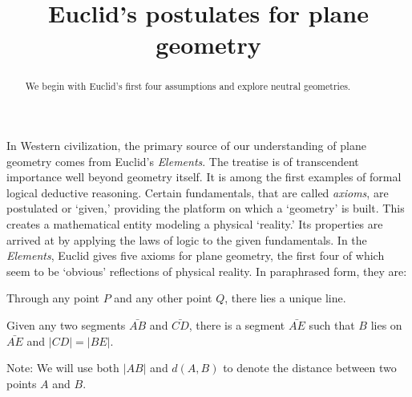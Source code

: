 \documentclass[noauthor,nooutcomes,12pt,hints,newpage,handout]{ximera}
\title{Euclid's postulates for plane geometry} %
\begin{document}
\begin{abstract}
We begin with Euclid's first four assumptions and explore neutral
geometries.
\end{abstract}
\maketitle







In Western civilization, the primary source of our understanding of
plane geometry comes from Euclid's \textit{Elements}. The treatise is
of transcendent importance well beyond geometry itself. It is among
the first examples of formal logical deductive reasoning. Certain
fundamentals, that are called \textit{axioms}, are postulated or
`given,' providing the platform on which a `geometry' is built. This
creates a mathematical entity modeling a physical `reality.' Its
properties are arrived at by applying the laws of logic to the given
fundamentals. In the \textit{Elements}, Euclid gives five axioms for
plane geometry, the first four of which seem to be `obvious'
reflections of physical reality. In paraphrased form, they are:

\begin{axiom}
Through any point $P$ and any other point $Q$, there lies a unique
line.
\end{axiom}

\begin{axiom}
Given any two segments $\bar{AB}$ and $\bar{CD}$, there is a
segment $\bar{AE}$ such that $B$ lies on $\bar{AE}$ and
$\left\vert CD\right\vert =\left\vert BE\right\vert$.

Note: We will use both $\left\vert AB\right\vert$ and $d(A,B)$ to
denote the distance between two points $A$ and $B$.
\end{axiom}
\end{document}

